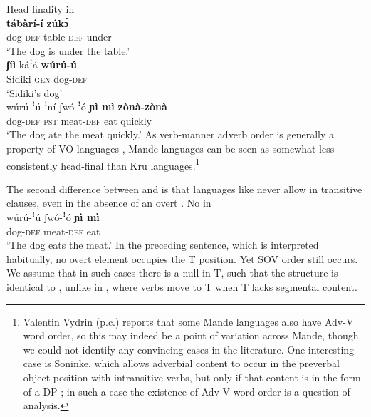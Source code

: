 \documentclass[output=paper,newtxmath,modfonts,nonflat,draftmode]{langsci/langscibook}
\begin{document}
\ea Head finality in  \label{ex:8:dafing}
 \\
 \textbf{{tábàrí-{\ꜝ}í}} \textbf{{zúk{\`ɔ}}} \\
dog-\textsc{def} table-\textsc{def} under \\
\glt  `The dog is under the table.'  \label{ex:8a:dafing}
\\
\gll \textbf{{ʃíì}} káꜝá \textbf{{wúrú-{\ꜝ}ú}} \\
Sidiki \textsc{gen} dog-\textsc{def} \\
\glt `Sidiki's dog' \label{ex:8b:dafing} 
\\
\gll wúrú-ꜝú {ꜝ{ní}} {ʃwó-ꜝó} \textbf{{ɲì mì}} \textbf{{zònà-zònà}} \\
{dog}-\textsc{def} \textsc{pst} meat-\textsc{def} eat quickly\\
\glt `The dog ate the meat quickly.' \label{ex:8c:dafing}
\z
\z
As verb-manner adverb order is generally a property of VO languages \citep{dryer07}, Mande languages can be seen as somewhat less consistently head-final than Kru languages.\footnote{Valentin Vydrin (p.c.) reports that some Mande languages also have Adv-V word order, so this may indeed be a point of variation across Mande, though we could not identify any convincing cases in the literature. One interesting case is Soninke, which allows adverbial content to occur in the preverbal object position with intransitive verbs, but only if that content is in the form of a DP \citep{creissels2017}; in such a case the existence of Adv-V word order is a question of analysis.}

The second difference between  and  is that  languages like  never allow  in transitive clauses, even in the absence of an overt . %
\ea No  in \\
\gll wúrú-ꜝú {} {ʃwó-ꜝó} \textbf{{ɲì mì}} \\
{dog}-\textsc{def} {} meat-\textsc{def} eat\\
\glt `The dog eats the meat.'
\z
In the preceding sentence, which is interpreted habitually, no overt  element occupies the T position. Yet SOV order still occurs. We assume that in such cases there is a null  in T, such that the structure is identical to , unlike in , where verbs move to T when T lacks segmental content.
\end{document}

